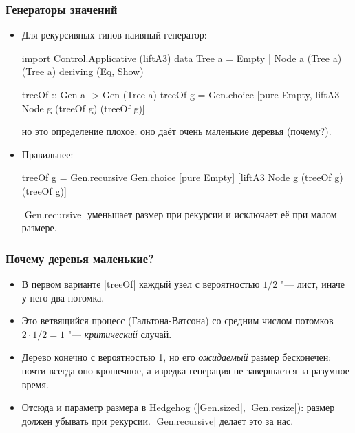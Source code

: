 \documentclass[11pt]{beamer}
\begin{document}
\begin{frame}[fragile]
  \frametitle{Генераторы значений}
  \begin{itemize}
    \item Для рекурсивных типов наивный генератор:
          \begin{haskelltiny}
            import Control.Applicative (liftA3)
            data Tree a = Empty | Node a (Tree a) (Tree a)
              deriving (Eq, Show)

            treeOf :: Gen a -> Gen (Tree a)
            treeOf g = Gen.choice [pure Empty,
                         liftA3 Node g (treeOf g) (treeOf g)]
          \end{haskelltiny}
          но это определение плохое: оно даёт очень маленькие деревья (почему?).
    \item Правильнее:
          \begin{haskelltiny}
            treeOf g = Gen.recursive Gen.choice
              [pure Empty]
              [liftA3 Node g (treeOf g) (treeOf g)]
          \end{haskelltiny}
          \haskinline|Gen.recursive| уменьшает размер при рекурсии и исключает её при малом размере.
  \end{itemize}
\end{frame}

\begin{frame}[fragile]
  \frametitle{Почему деревья маленькие?}
  \begin{itemize}
    \item В первом варианте \haskinline|treeOf| каждый узел с вероятностью $1/2$ "--- лист, иначе у него два потомка.
    \item Это ветвящийся процесс (Гальтона-Ватсона) со средним числом потомков $2 \cdot 1/2 = 1$ "--- \emph{критический} случай.
          \pause
    \item Дерево конечно с вероятностью 1, но его \emph{ожидаемый} размер бесконечен: почти всегда оно крошечное, а изредка генерация не завершается за разумное время.
    \item Отсюда и параметр размера в Hedgehog (\haskinline|Gen.sized|, \haskinline|Gen.resize|): размер должен убывать при рекурсии. \haskinline|Gen.recursive| делает это за нас.
  \end{itemize}
\end{frame}
\end{document}
